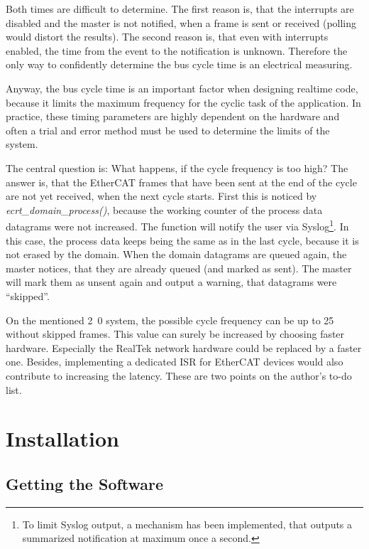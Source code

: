 \documentclass[a4paper,12pt,BCOR6mm,bibtotoc,idxtotoc]{scrbook}
\begin{document}
Both times are difficult to determine. The first reason is, that the
interrupts are disabled and the master is not notified, when a frame is sent
or received (polling would distort the results). The second reason is, that
even with interrupts enabled, the time from the event to the notification is
unknown. Therefore the only way to confidently determine the bus cycle time is
an electrical measuring.

Anyway, the bus cycle time is an important factor when designing realtime
code, because it limits the maximum frequency for the cyclic task of the
application.  In practice, these timing parameters are highly dependent on the
hardware and often a trial and error method must be used to determine the
limits of the system.

The central question is: What happens, if the cycle frequency is too high? The
answer is, that the EtherCAT frames that have been sent at the end of the
cycle are not yet received, when the next cycle starts.  First this is noticed
by \textit{ecrt\_domain\_process()}, because the working counter of the
process data datagrams were not increased. The function will notify the user
via Syslog\footnote{To limit Syslog output, a mechanism has been implemented,
that outputs a summarized notification at maximum once a second.}. In this
case, the process data keeps being the same as in the last cycle, because it
is not erased by the domain. When the domain datagrams are queued again, the
master notices, that they are already queued (and marked as sent). The master
will mark them as unsent again and output a warning, that datagrams were
``skipped''.

On the mentioned \unit{2.0}{\giga\hertz} system, the possible cycle frequency
can be up to \unit{25}{\kilo\hertz} without skipped frames. This value can
surely be increased by choosing faster hardware. Especially the RealTek
network hardware could be replaced by a faster one. Besides, implementing a
dedicated ISR for EtherCAT devices would also contribute to increasing the
latency. These are two points on the author's to-do list.


\chapter{Installation}
\label{sec:installation}

\section{Getting the Software}
\label{sec:getting}
\end{document}
